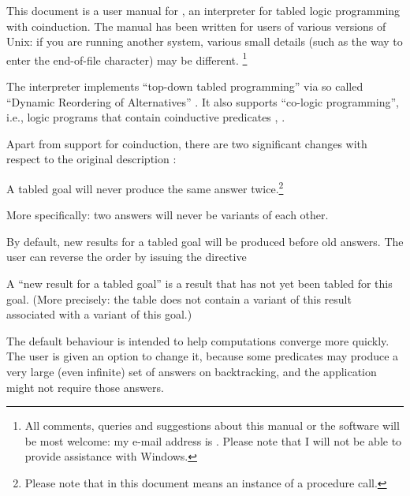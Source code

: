 

This document is a user manual for , an interpreter for tabled
logic programming with coinduction.  The manual has been written for users of
various versions of Unix: if you are running another system, various small
details (such as the way to enter the end-of-file character) may be
different.%
\footnote{
  All comments, queries and suggestions about this manual or the software
  will be most welcome: my e-mail address is
  .  Please note that I will not be able
  to provide assistance with Windows.}

The interpreter implements ``top-down tabled programming'' via so called
``Dynamic Reordering of Alternatives'' \cite{guo-gupta-dra}.  It also
supports ``co-logic programming'', i.e., logic programs that contain
coinductive predicates \cite{coinductive}, \cite{co-LP}.


Apart from support for coinduction, there are two significant changes with
respect to the original description \cite{guo-gupta-dra}:
\begin{Enumerate}

\item
  A tabled goal will never produce the same answer twice.\footnote{
  Please note that in this document  means an instance of a
  procedure call.}

  More specifically: two answers will never be variants of each
  other.

\item
  By default, new results for a tabled goal will be produced before old
  answers.  The user can reverse the order by issuing the directive\\
  \ind{}\label{dir:old-first}

  A ``new result for a tabled goal''\label{new-result} is a result that has
  not yet been tabled for this goal.  (More precisely: the table does not
  contain a variant of this result associated with a variant of this goal.)

  The default behaviour is intended to help computations converge more
  quickly.  The user is given an option to change it, because some predicates
  may produce a very large (even infinite) set of answers on backtracking,
  and the application might not require those answers.
\end{Enumerate}



